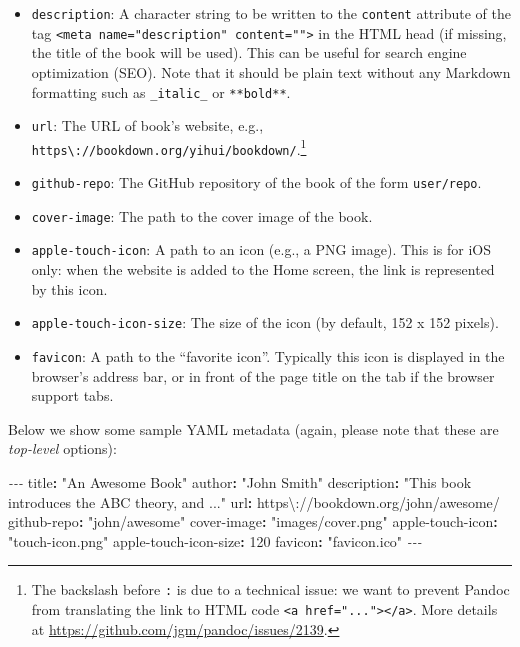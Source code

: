 \documentclass[
  12pt,
]{krantz}
\newenvironment{Shaded}{\begin{snugshade}}{\end{snugshade}}
\newcommand{\AttributeTok}[1]{\textcolor[rgb]{0.77,0.63,0.00}{#1}}
\newcommand{\DecValTok}[1]{\textcolor[rgb]{0.00,0.00,0.81}{#1}}
\newcommand{\FunctionTok}[1]{\textcolor[rgb]{0.00,0.00,0.00}{#1}}
\newcommand{\KeywordTok}[1]{\textcolor[rgb]{0.13,0.29,0.53}{\textbf{#1}}}
\newcommand{\PreprocessorTok}[1]{\textcolor[rgb]{0.56,0.35,0.01}{\textit{#1}}}
\newcommand{\StringTok}[1]{\textcolor[rgb]{0.31,0.60,0.02}{#1}}
\providecommand{\tightlist}{%
  \setlength{\itemsep}{0pt}\setlength{\parskip}{0pt}}
\theoremstyle{definition}
\theoremstyle{definition}
\theoremstyle{definition}
\theoremstyle{definition}
\theoremstyle{remark}
\begin{document}
\begin{itemize}
\tightlist
\item
  \texttt{description}: A character string to be written to the \texttt{content} attribute of the tag \texttt{\textless{}meta\ name="description"\ content=""\textgreater{}} in the HTML head (if missing, the title of the book will be used). This can be useful for search engine optimization (SEO). Note that it should be plain text without any Markdown formatting such as \texttt{\_italic\_} or \texttt{**bold**}.
\item
  \texttt{url}: The URL of book's website, e.g., \texttt{https\textbackslash{}://bookdown.org/yihui/bookdown/}.\footnote{The backslash before \texttt{:} is due to a technical issue: we want to prevent Pandoc from translating the link to HTML code \texttt{\textless{}a\ href="..."\textgreater{}\textless{}/a\textgreater{}}. More details at \url{https://github.com/jgm/pandoc/issues/2139}.}
\item
  \texttt{github-repo}: The GitHub repository of the book of the form \texttt{user/repo}.
\item
  \texttt{cover-image}: The path to the cover image of the book.
\item
  \texttt{apple-touch-icon}: A path to an icon (e.g., a PNG image). This is for iOS only: when the website is added to the Home screen, the link is represented by this icon.
\item
  \texttt{apple-touch-icon-size}: The size of the icon (by default, 152 x 152 pixels).
\item
  \texttt{favicon}: A path to the ``favorite icon''. Typically this icon is displayed in the browser's address bar, or in front of the page title on the tab if the browser support tabs.
\end{itemize}

Below we show some sample YAML metadata (again, please note that these are \emph{top-level} options):

\begin{Shaded}
\begin{Highlighting}[]
\PreprocessorTok{{-}{-}{-}}
\FunctionTok{title}\KeywordTok{:}\AttributeTok{ }\StringTok{"An Awesome Book"}
\FunctionTok{author}\KeywordTok{:}\AttributeTok{ }\StringTok{"John Smith"}
\FunctionTok{description}\KeywordTok{:}\AttributeTok{ }\StringTok{"This book introduces the ABC theory, and ..."}
\FunctionTok{url}\KeywordTok{:}\AttributeTok{ }\StringTok{\textquotesingle{}https\textbackslash{}://bookdown.org/john/awesome/\textquotesingle{}}
\FunctionTok{github{-}repo}\KeywordTok{:}\AttributeTok{ }\StringTok{"john/awesome"}
\FunctionTok{cover{-}image}\KeywordTok{:}\AttributeTok{ }\StringTok{"images/cover.png"}
\FunctionTok{apple{-}touch{-}icon}\KeywordTok{:}\AttributeTok{ }\StringTok{"touch{-}icon.png"}
\FunctionTok{apple{-}touch{-}icon{-}size}\KeywordTok{:}\AttributeTok{ }\DecValTok{120}
\FunctionTok{favicon}\KeywordTok{:}\AttributeTok{ }\StringTok{"favicon.ico"}
\PreprocessorTok{{-}{-}{-}}
\end{Highlighting}
\end{Shaded}
\end{document}
